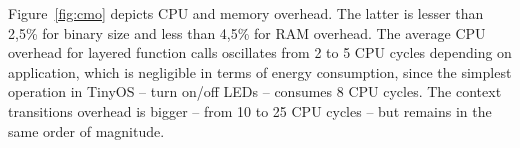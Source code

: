 Figure~\ref{fig:cmo} depicts CPU and memory overhead. The latter is lesser than
2,5\% for binary size and less than 4,5\% for RAM overhead. The average CPU
overhead for layered function calls oscillates from 2 to 5 CPU cycles depending
on application, which is negligible in terms of energy consumption, since the
simplest operation in TinyOS -- turn on/off LEDs -- consumes 8 CPU cycles. The
context transitions overhead is bigger -- from 10 to 25 CPU cycles -- but
remains in the same order of magnitude.

